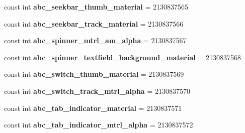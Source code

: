 \begin{DoxyCompactItemize}
const int {\bfseries abc\+\_\+seekbar\+\_\+thumb\+\_\+material} = 2130837565
\item 
\mbox{\label{class_pinned_app_1_1_droid_1_1_resource_1_1_drawable_a6b270a37a3ac6b7d3cab81d3a7bf235d}} 
const int {\bfseries abc\+\_\+seekbar\+\_\+track\+\_\+material} = 2130837566
\item 
\mbox{\label{class_pinned_app_1_1_droid_1_1_resource_1_1_drawable_aaed322a12ec82585a61e596672637a31}} 
const int {\bfseries abc\+\_\+spinner\+\_\+mtrl\+\_\+am\+\_\+alpha} = 2130837567
\item 
\mbox{\label{class_pinned_app_1_1_droid_1_1_resource_1_1_drawable_a542d8d0913570d37f500a2fdac4609b0}} 
const int {\bfseries abc\+\_\+spinner\+\_\+textfield\+\_\+background\+\_\+material} = 2130837568
\item 
\mbox{\label{class_pinned_app_1_1_droid_1_1_resource_1_1_drawable_ac89449aff5f89c34e75e35c69c28c9ba}} 
const int {\bfseries abc\+\_\+switch\+\_\+thumb\+\_\+material} = 2130837569
\item 
\mbox{\label{class_pinned_app_1_1_droid_1_1_resource_1_1_drawable_af93510128dc0797b028dee45aca61740}} 
const int {\bfseries abc\+\_\+switch\+\_\+track\+\_\+mtrl\+\_\+alpha} = 2130837570
\item 
\mbox{\label{class_pinned_app_1_1_droid_1_1_resource_1_1_drawable_a423ee7124fe6ad3744142df78972a3b4}} 
const int {\bfseries abc\+\_\+tab\+\_\+indicator\+\_\+material} = 2130837571
\item 
\mbox{\label{class_pinned_app_1_1_droid_1_1_resource_1_1_drawable_a279bd7e7acf74cc510ea3074586209b7}} 
const int {\bfseries abc\+\_\+tab\+\_\+indicator\+\_\+mtrl\+\_\+alpha} = 2130837572
\item 
\mbox{\label{class_pinned_app_1_1_droid_1_1_resource_1_1_drawable_af698523e79238f506f1cc14ab5966b86}} 

\end{DoxyCompactItemize}
